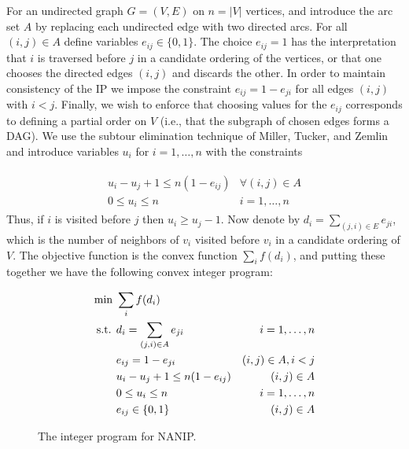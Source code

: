 For an undirected graph $G = (V,E)$ on $n = |V|$ vertices, and introduce the
arc set $A$ by replacing each undirected edge with two directed arcs.  For all
$(i,j)\in A$ define variables $e_{ij} \in \{ 0,1 \}$.  The choice $e_{ij} = 1$
has the interpretation that $i$ is traversed before $j$ in a candidate ordering
of the vertices, or that one chooses the directed edges $(i,j)$ and discards
the other. In order to maintain consistency of the IP we impose the constraint
$e_{ij} = 1 - e_{ji}$ for all edges $(i,j)$ with $i < j$. Finally, we wish to
enforce that choosing values for the $e_{ij}$ corresponds to defining a partial
order on $V$ (i.e., that the subgraph of chosen edges forms a DAG). We use the
subtour elimination technique of Miller, Tucker, and Zemlin
\cite{miller1960integer} and introduce variables $u_i$ for $i = 1, \dots, n$
with the constraints

\begin{align}
\label{eq:dag-constraint}
\begin{matrix}
   u_i - u_j + 1 \leq n (1 - e_{ij}) & \forall (i,j) \in A \\ 
   0 \leq u_i \leq n & i = 1, \dots, n 
\end{matrix}
\end{align}
\noindent Thus, if $i$ is visited before $j$ then $u_i \geq u_j - 1$.
Now denote by $d_i = \sum_{(j,i) \in E} e_{ji}$, which is the number of
neighbors of $v_i$ visited before $v_i$ in a candidate ordering of $V$. The
objective function is the convex function $\sum_{i} f(d_i)$, and putting these
together we have the following convex integer program: 

\begin{figure}[h]
\begin{centering}
\begin{align*}
\textup{min }  & \sum_i f(d_i)                       & \\ 
\textup{s.t. } & d_i = \sum_{(j,i) \in A} e_{ji}     & i = 1, \dots, n \\ 
               & e_{ij} = 1 - e_{ji}                 & (i,j) \in A, i < j \\ 
               & u_i - u_j + 1 \leq n (1 - e_{ij})   & (i,j) \in A \\ 
               & 0 \leq u_i \leq n                   & i = 1, \dots, n \\ 
               & e_{ij} \in \{0,1\}                    & (i,j) \in A
\end{align*}
\end{centering}
\caption{The integer program for NANIP.}
\end{figure}

